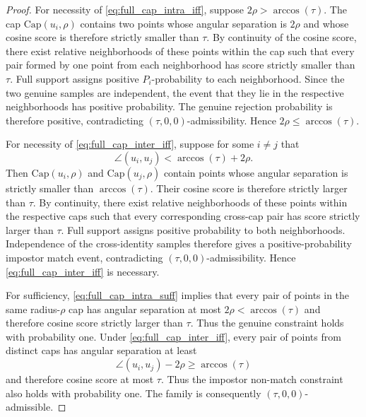 \documentclass[10pt,a4paper]{amsart}
\begin{document}
\begin{proof}
%
For necessity of \eqref{eq:full_cap_intra_iff}, suppose $2\rho>\arccos(\tau)$. The cap $\mathrm{Cap}(u_i,\rho)$ contains two points whose angular separation is $2\rho$ and whose cosine score is therefore strictly smaller than $\tau$. By continuity of the cosine score, there exist relative neighborhoods of these points within the cap such that every pair formed by one point from each neighborhood has score strictly smaller than $\tau$. Full support assigns positive $P_i$-probability to each neighborhood. Since the two genuine samples are independent, the event that they lie in the respective neighborhoods has positive probability. The genuine rejection probability is therefore positive, contradicting $(\tau,0,0)$-admissibility. Hence $2\rho\le\arccos(\tau)$.

For necessity of \eqref{eq:full_cap_inter_iff}, suppose for some $i\ne j$ that
%
\begin{equation}
\angle(u_i,u_j) < \arccos(\tau)+2\rho.
\end{equation}
%
Then $\mathrm{Cap}(u_i,\rho)$ and $\mathrm{Cap}(u_j,\rho)$ contain points whose angular separation is strictly smaller than $\arccos(\tau)$. Their cosine score is therefore strictly larger than $\tau$. By continuity, there exist relative neighborhoods of these points within the respective caps such that every corresponding cross-cap pair has score strictly larger than $\tau$. Full support assigns positive probability to both neighborhoods. Independence of the cross-identity samples therefore gives a positive-probability impostor match event, contradicting $(\tau,0,0)$-admissibility. Hence \eqref{eq:full_cap_inter_iff} is necessary.

For sufficiency, \eqref{eq:full_cap_intra_suff} implies that every pair of points in the same radius-$\rho$ cap has angular separation at most $2\rho<\arccos(\tau)$ and therefore cosine score strictly larger than $\tau$. Thus the genuine constraint holds with probability one. Under \eqref{eq:full_cap_inter_iff}, every pair of points from distinct caps has angular separation at least
\[
\angle(u_i,u_j)-2\rho \ge \arccos(\tau)
\]
and therefore cosine score at most $\tau$. Thus the impostor non-match constraint also holds with probability one. The family is consequently $(\tau,0,0)$-admissible.
%
\end{proof}
\end{document}

